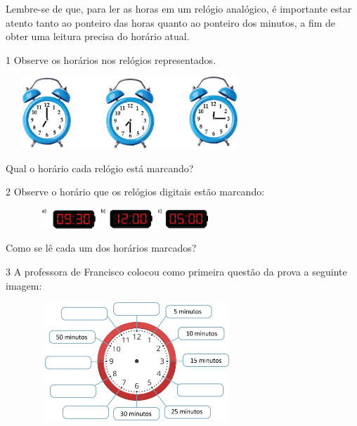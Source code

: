 \begin{multicols}{2}
{Lembre-se de que, para ler as horas em um relógio analógico, é importante estar atento tanto ao ponteiro das horas quanto ao ponteiro dos minutos, a fim de obter uma leitura precisa do horário atual.
}


\num{1} Observe os horários nos relógios representados.


\includegraphics[width=3.66698in,height=1.05843in]{media/image51.png}

Qual o horário cada relógio está marcando?




\num{2} Observe o horário que os relógios digitais estão marcando:


\includegraphics[width=3.54197in,height=0.29169in]{media/image52.png}

Como se lê cada um dos horários marcados?




\num{3} A professora de Francisco colocou como primeira questão da prova a seguinte imagem:


\includegraphics[width=3.90034in,height=1.75015in]{media/image53.png}


\end{multicols}
